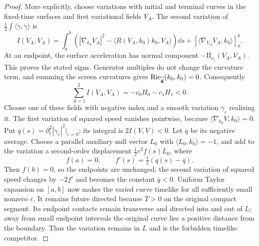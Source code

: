 \begin{proof}
More explicitly, choose variations with initial and terminal curves in the
fixed-time surfaces and first variational fields $V_A$.  The second
variation of $\frac12\int\langle\dot\gamma,\dot\gamma\rangle$ is
\[
 I(V_A,V_A)=
 \int_a^b\left(
 |\nabla_{k_0}V_A|^2
 -\langle R(V_A,k_0)k_0,V_A\rangle\right)\dd s
 +\left[\langle\nabla_{V_A}V_A,k_0\rangle\right]_a^b.
\]
At an endpoint, the surface acceleration has normal component
$-\mathrm{II}_{\nu_j}(V_A,V_A)$.  This proves the stated signs.  Generator
multiples do not change the curvature term, and summing the screen
curvatures gives $\operatorname{Ric}_{\widehat{\mathbf g}}(k_0,k_0)=0$.  Consequently
\begin{equation}
 \sum_{A=1}^2I(V_A,V_A)=-c_0H_0-c_1H_1<0.
 \label{geo-negative-null-index}
\end{equation}
Choose one of these fields with negative index and a smooth variation
$\gamma_\varepsilon$ realizing it.  The first variation of squared speed
vanishes pointwise, because
$\langle\nabla_{k_0}V,k_0\rangle=0$.  Put
$q(s)=\partial_\varepsilon^2|\dot\gamma_\varepsilon|^2|_{\varepsilon=0}$;
its integral is $2I(V,V)<0$.  Let $\overline q$ be its negative average.
Choose a parallel auxiliary null vector $L_0$ with
$\langle L_0,k_0\rangle=-1$, and add to the variation a second-order
displacement $\frac12\varepsilon^2 f(s)L_0$, where
\[
 f(a)=0,\qquad f'(s)=\tfrac12(q(s)-\overline q).
\]
Then $f(b)=0$, so the endpoints are unchanged; the second variation of
squared speed changes by $-2f'$ and becomes the constant $\overline q<0$.
Uniform Taylor expansion on $[a,b]$ now makes the varied curve timelike for
all sufficiently small nonzero $\varepsilon$.  It remains future directed
because $\dot T>0$ on the original compact segment.  Its endpoint contacts
remain transverse and directed into and out of $L$; away from small endpoint
intervals the original curve lies a positive distance from the boundary.
Thus the variation remains in $L$ and is the forbidden timelike competitor.
\end{proof}


